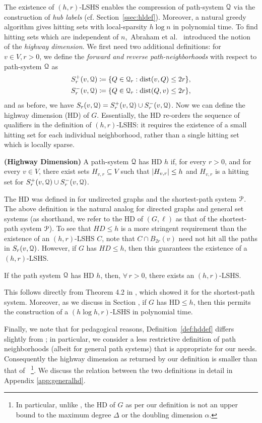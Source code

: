 The existence of $(h,r)$-LSHS enables the compression of path-system $\mathcal{Q}$ via the construction of \emph{hub labels} (cf. Section~\ref{ssec:hldef}). Moreover, a natural greedy algorithm gives hitting sets with local-sparsity $h\log n$ in polynomial time. To find hitting sets which are independent of $n$,~Abraham et al.~\cite{highway2013} introduced the notion of the \emph{highway dimension}. We first need two additional definitions:
for $v\in V, r>0$, we define the \emph{forward and reverse path-neighborhoods} with respect to path-system $\mathcal{Q}$ as 
\begin{align*}
S_r^+(v,\calQ) &\defeq\crl*{Q\in\calQ_r: \dist(v,Q)\leq 2r}, \\  
S_r^-(v,\calQ) &\defeq\crl*{Q\in\calQ_r: \dist(Q,v)\leq 2r},
\end{align*}
and as before, we have $S_r(v,\mathcal{Q}) = S_r^+(v,\mathcal{Q})\cup S_r^-(v,\mathcal{Q})$. Now we can define the highway dimension (HD) of $G$. Essentially, the HD re-orders the sequence of qualifiers in the definition of $(h,r)$-LSHS: it requires the existence of a small hitting set for each individual neighborhood, rather than a single hitting set which is locally sparse. 
\begin{definition}
\label{def:hddef}
\textbf{(Highway Dimension)}
A path-system $\mathcal{Q}$ has HD $h$ if, for every $r>0$, and for every $v\in V$, there exist sets $H_{v,r}\subseteq V$ such that $\lvert H_{v,r}\rvert\leq h$ and $H_{v,r}$ is a hitting set for $S_r^+(v,\mathcal{Q})\cup S_r^-(v,\mathcal{Q})$.
\end{definition}
The HD was defined in \cite{highway2013} for undirected graphs and the shortest-path system $\mathcal{P}$. 
The above definition is the natural analog for directed graphs and general set systems (as shorthand, we refer to the HD of $(G,\ell)$ as that of the shortest-path system $\mathcal{P}$). 
To see that $HD\leq h$ is a more stringent requirement than the existence of an $(h,r)$-LSHS $C$, note that $C\cap B_{2r}(v)$ need not hit all the paths in $S_r(v,\mathcal{Q})$. 
However, if $G$ has $HD\leq h$, then this guarantees the existence of a $(h,r)$-LSHS.
\begin{proposition}
If the path system $\mathcal{Q}$ has HD $h$, then, $\forall\,r>0$, there exists an $(h,r)$-LSHS.
\end{proposition}
This follows directly from Theorem 4.2 in \cite{highway2013}, which showed it for the shortest-path system. Moreover, as we discuss in Section , if $G$ has HD$\leq h$, then this permits the construction of a $(h\log h,r)$-LSHS in polynomial time.


Finally, we note that for pedagogical reasons, Definition~\ref{def:hddef} differs slightly from \cite{highway2013}; in particular, we consider a less restrictive definition of path neighborhoods (albeit for general path systems) that is appropriate for our needs. Consequently the highway dimension as returned by our definition is smaller than that of \cite{highway2013}~\footnote{In particular, unlike \cite{highway2013}, the HD of $G$ as per our definition is not an upper bound to the maximum degree $\Delta$ or the doubling dimension $\alpha$.}.
We discuss the relation between the two definitions in detail in Appendix \ref{app:generalhd}. 

